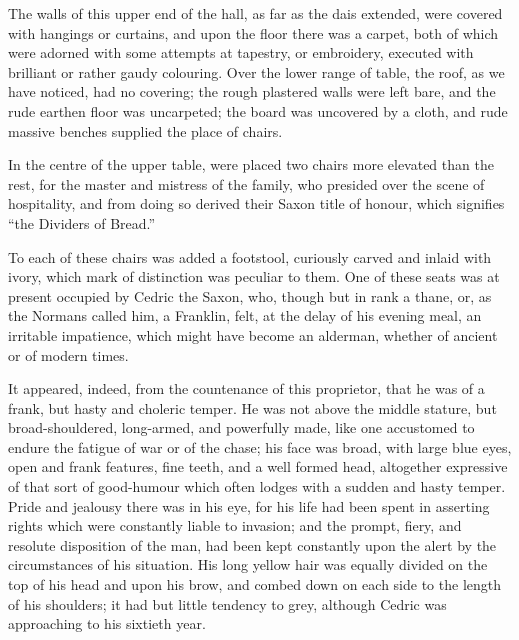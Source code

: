 The walls of this upper end of the hall, as far as the dais extended,
were covered with hangings or curtains, and upon the floor there was a
carpet, both of which were adorned with some attempts at tapestry, or
embroidery, executed with brilliant or rather gaudy colouring. Over the
lower range of table, the roof, as we have noticed, had no covering; the
rough plastered walls were left bare, and the rude earthen floor was
uncarpeted; the board was uncovered by a cloth, and rude massive benches
supplied the place of chairs.

In the centre of the upper table, were placed two chairs more elevated
than the rest, for the master and mistress of the family, who presided
over the scene of hospitality, and from doing so derived their Saxon
title of honour, which signifies ``the Dividers of Bread.''

To each of these chairs was added a footstool, curiously carved and
inlaid with ivory, which mark of distinction was peculiar to them. One
of these seats was at present occupied by Cedric the Saxon, who, though
but in rank a thane, or, as the Normans called him, a Franklin, felt, at
the delay of his evening meal, an irritable impatience, which might have
become an alderman, whether of ancient or of modern times.

It appeared, indeed, from the countenance of this proprietor, that he
was of a frank, but hasty and choleric temper. He was not above the
middle stature, but broad-shouldered, long-armed, and powerfully made,
like one accustomed to endure the fatigue of war or of the chase; his
face was broad, with large blue eyes, open and frank features, fine
teeth, and a well formed head, altogether expressive of that sort of
good-humour which often lodges with a sudden and hasty temper. Pride and
jealousy there was in his eye, for his life had been spent in asserting
rights which were constantly liable to invasion; and the prompt, fiery,
and resolute disposition of the man, had been kept constantly upon the
alert by the circumstances of his situation. His long yellow hair was
equally divided on the top of his head and upon his brow, and combed
down on each side to the length of his shoulders; it had but little
tendency to grey, although Cedric was approaching to his sixtieth year.

